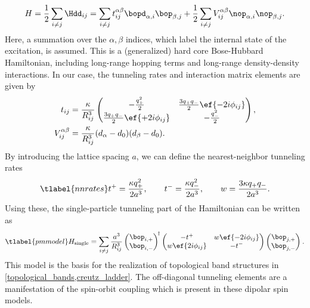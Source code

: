 \begin{align}
    H = \frac{1}{2} \sum_{i\ne j} \Hdd_{ij} = \sum_{i\ne j}  t_{ij}^{\alpha\beta} \bopd_{\alpha,i} \bop_{\beta,j}
    +\frac{1}{2}\sum_{i\ne j} V_{ij}^{\alpha\beta} \nop_{\alpha,i} \nop_{\beta,j}.
\end{align}
Here, a summation over the $\alpha, \beta$ indices, which label the internal state of the excitation, is assumed. This is a (generalized) hard core Bose-Hubbard Hamiltonian, including long-range hopping terms and long-range density-density interactions. In our case, the tunneling rates and interaction matrix elements are given by
\begin{align}
    t_{ij} &= \frac{\kappa}{R_{ij}^3} \begin{pmatrix}
    -\frac{q_+^2}{2} & \frac{3q_+q_-}{2} \ef{-2i \phi_{ij}} \\
    \frac{3q_+q_-}{2} \ef{+2i \phi_{ij}} & -\frac{q_-^2}{2}
\end{pmatrix}, \\
    V_{ij}^{\alpha\beta} &= \frac{\kappa}{R_{ij}^3} (d_\alpha-d_0)(d_\beta-d_0).
\end{align}
By introducing the lattice spacing $a$, we can define the nearest-neighbor tunneling rates
\begin{align} \tlabel{nnrates}
    t^+ = \frac{\kappa q_{+}^2}{2a^3},\qquad
    t^- = \frac{\kappa q_{-}^2}{2a^3},\qquad
    w = \frac{3 \kappa q_{+}q_{-}}{2a^3}.
\end{align}
Using these, the single-particle tunneling part of the Hamiltonian can be written as
\begin{align} \tlabel{pmmodel}
    H_\text{single} = \sum_{i\ne j} \frac{a^3}{R_{ij}^3}
    \begin{pmatrix}
        \bop_{i,+} \\
        \bop_{i,-}
    \end{pmatrix}^{\!\dag}
    \begin{pmatrix}
        -t^+ & w \ef{-2i \phi_{ij}} \\
        w \ef{2i \phi_{ij}} & -t^- \\
    \end{pmatrix}
    \begin{pmatrix}
        \bop_{j,+} \\
        \bop_{j,-}
    \end{pmatrix}^{\vphantom\dag}.
\end{align}
This model is the basis for the realization of topological band structures in \cref{topological_bands,creutz_ladder}. The off-diagonal tunneling elements are a manifestation of the spin-orbit coupling which is present in these dipolar spin models.



